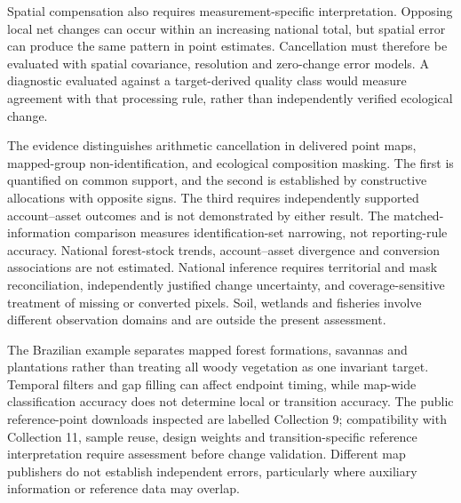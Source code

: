 \documentclass[11pt,a4paper]{article}
\begin{document}
Spatial compensation also requires measurement-specific interpretation. Opposing local net changes can occur within an increasing national total, but spatial error can produce the same pattern in point estimates. Cancellation must therefore be evaluated with spatial covariance, resolution and zero-change error models. A diagnostic evaluated against a target-derived quality class would measure agreement with that processing rule, rather than independently verified ecological change.

The evidence distinguishes arithmetic cancellation in delivered point maps, mapped-group non-identification, and ecological composition masking. The first is quantified on common support, and the second is established by constructive allocations with opposite signs. The third requires independently supported account--asset outcomes and is not demonstrated by either result. The matched-information comparison measures identification-set narrowing, not reporting-rule accuracy. National forest-stock trends, account--asset divergence and conversion associations are not estimated. National inference requires territorial and mask reconciliation, independently justified change uncertainty, and coverage-sensitive treatment of missing or converted pixels. Soil, wetlands and fisheries involve different observation domains and are outside the present assessment.

The Brazilian example separates mapped forest formations, savannas and plantations rather than treating all woody vegetation as one invariant target. Temporal filters and gap filling can affect endpoint timing, while map-wide classification accuracy does not determine local or transition accuracy. The public reference-point downloads inspected are labelled Collection 9; compatibility with Collection 11, sample reuse, design weights and transition-specific reference interpretation require assessment before change validation. Different map publishers do not establish independent errors, particularly where auxiliary information or reference data may overlap.
\end{document}
